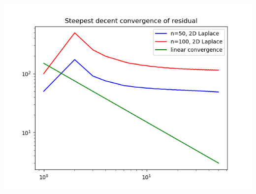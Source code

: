 \begin{SolutionSheet}[\ref{sheet8}]
\begin{Solution}[Programming]
    \includegraphics[width=\textwidth]{figures/laplace-steepest-decent}
  \end{Solution}

\end{SolutionSheet}


